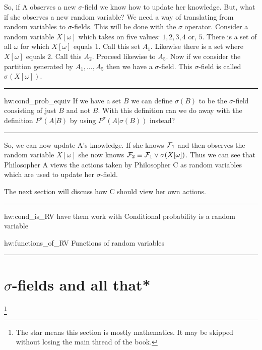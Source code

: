 \documentclass[14pt]{extarticle}
\newenvironment{textHW}{
  \noindent\rule{\textwidth}{1pt}%
  \begin{list}{}{
      \setlength{\labelwidth}{1cm}
      \setlength{\labelsep}{0.3cm}
      \setlength{\leftmargin}{1.3cm}
      \setlength{\rightmargin}{1cm}
      \setlength{\parsep}{0.5ex plus0.2ex minus0.1ex}
      \setlength{\topsep}{1pt plus3pt minus1pt}
      \setlength{\itemsep}{0ex plus0.2ex} 
      \renewcommand{\makelabel}[1]{\label{thw:##1}{\ref{##1}}}
      \sl}}%
  {\end{list}\rule{\textwidth}{1pt}}
\newcommand{\notes}{}
\begin{document}
So, if A observes a new $\sigma$-field we know how to update her
knowledge.  But, what if she observes a new random variable?  We need
a way of translating from random variables to $\sigma$-fields.  This
will be done with the $\sigma$ operator.  Consider a random variable
$X[\omega]$ which takes on five values: $1,2,3,4$ or, $5$.  There is
a set of all $\omega$ for which $X[\omega]$ equals 1.  Call this
set $A_1$.  Likewise there is a set where $X[\omega]$ equals 2. Call
this $A_2$.  Proceed likewise to $A_5$.  Now if we consider the
partition generated by $A_1,\ldots,A_5$ then we have a
$\sigma$-field.  This $\sigma$-field is called
$\sigma(X[\omega])$. 

\begin{textHW}
\item[hw:cond_prob_equiv] If we have a set $B$ we can define
  $\sigma(B)$ to be the $\sigma$-field consisting of just $B$ and
  not $B$.  With this definition can we do away with the definition
  $P^s(A|B)$ by using $P^\sigma(A|\sigma(B))$ instead?  
\end{textHW}

So, we can now update A's knowledge.  If she knows ${\cal F}_1$ and
then observes the random variable $X[\omega]$ she now knows ${\cal
  F}_2 \equiv {\cal F}_1 \vee \sigma(X[\omega])$.  Thus we can see
that Philosopher A views the actions taken by Philosopher C as random
variables which are used to update her $\sigma$-field.

The next section will discuss how C should view her own actions.

\begin{textHW}
\item[hw:cond_is_RV] {\notes have them work with Conditional probability is a random variable}

\item[hw:functions_of_RV] {\notes Functions of random variables}
\end{textHW}



    \section{$\sigma$-fields and all that*}

\renewcommand{\thefootnote}{\fnsymbol{footnote}}
\footnote[1]{The star means this section is mostly mathematics.  It
may be skipped without losing the main thread of the book.}
\renewcommand{\thefootnote}{\arabic{footnote}}
\end{document}
